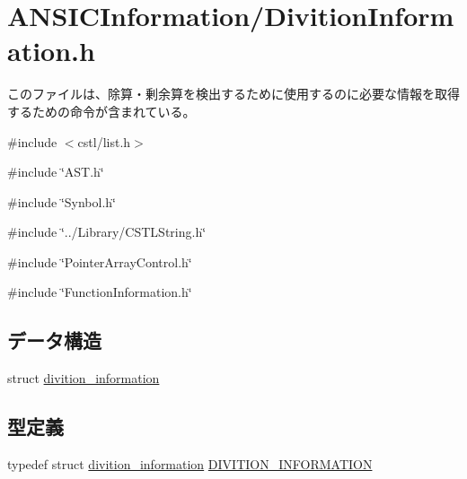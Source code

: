 \section{ANSICInformation/DivitionInformation.h}
\label{DivitionInformation_8h}


このファイルは、除算・剰余算を検出するために使用するのに必要な情報を取得するための命令が含まれている。  


{\ttfamily \#include $<$cstl/list.h$>$}\par
{\ttfamily \#include \char`\"{}AST.h\char`\"{}}\par
{\ttfamily \#include \char`\"{}Synbol.h\char`\"{}}\par
{\ttfamily \#include \char`\"{}../Library/CSTLString.h\char`\"{}}\par
{\ttfamily \#include \char`\"{}PointerArrayControl.h\char`\"{}}\par
{\ttfamily \#include \char`\"{}FunctionInformation.h\char`\"{}}\par
\subsection*{データ構造}
\begin{DoxyCompactItemize}
\item 
struct \hyperlink{structdivition__information}{divition\_\-information}
\end{DoxyCompactItemize}
\subsection*{型定義}
\begin{DoxyCompactItemize}
\item 
typedef struct \hyperlink{structdivition__information}{divition\_\-information} \hyperlink{DivitionInformation_8h_afe33e19b368476a1c944f5b32da0a9d7}{DIVITION\_\-INFORMATION}
\end{DoxyCompactItemize}
